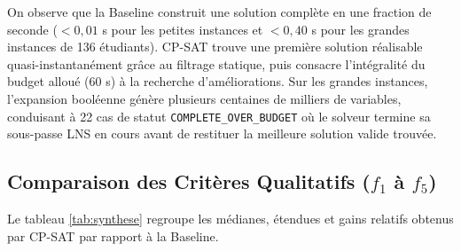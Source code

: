 \documentclass[10pt,a4paper]{article}
\begin{document}
On observe que la Baseline construit une solution complète en une fraction de seconde ($< 0{,}01$ s pour les petites instances et $< 0{,}40$ s pour les grandes instances de 136 étudiants). CP-SAT trouve une première solution réalisable quasi-instantanément grâce au filtrage statique, puis consacre l'intégralité du budget alloué (60 s) à la recherche d'améliorations. Sur les grandes instances, l'expansion booléenne génère plusieurs centaines de milliers de variables, conduisant à 22 cas de statut \texttt{COMPLETE\_OVER\_BUDGET} où le solveur termine sa sous-passe LNS en cours avant de restituer la meilleure solution valide trouvée.

\subsection{Comparaison des Critères Qualitatifs ($f_1$ à $f_5$)}
Le tableau \ref{tab:synthese} regroupe les médianes, étendues et gains relatifs obtenus par CP-SAT par rapport à la Baseline.
\end{document}
